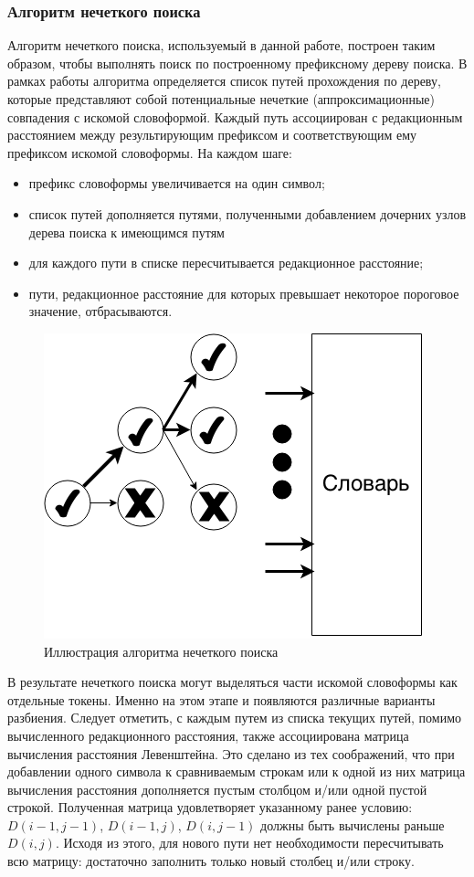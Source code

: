 \subsubsection{Алгоритм нечеткого поиска}
Алгоритм нечеткого поиска, используемый в данной работе, построен таким образом, чтобы выполнять поиск по построенному префиксному дереву поиска. В рамках работы алгоритма определяется список путей прохождения по дереву, которые представляют собой потенциальные нечеткие (аппроксимационные) совпадения с искомой словоформой. Каждый путь ассоциирован с редакционным расстоянием между результирующим префиксом и соответствующим ему префиксом искомой словоформы. На каждом шаге:
\begin{itemize}
	\item
	префикс словоформы увеличивается на один символ;
	\item
	список путей дополняется путями, полученными добавлением дочерних узлов дерева поиска к имеющимся путям
	\item
	для каждого пути в списке пересчитывается редакционное расстояние;
	\item
	пути, редакционное расстояние для которых превышает некоторое пороговое значение, отбрасываются.
\end{itemize}
\begin{figure}[H]
	\centering
	\includegraphics[scale=0.6]{img/treesearch.png}
	\caption{Иллюстрация алгоритма нечеткого поиска}
\end{figure}
В результате нечеткого поиска могут выделяться части искомой словоформы как отдельные токены. Именно на этом этапе и появляются различные варианты разбиения. Следует отметить, с каждым путем из списка текущих путей, помимо вычисленного редакционного расстояния, также ассоциирована матрица вычисления расстояния Левенштейна. Это сделано из тех соображений, что при добавлении одного символа к сравниваемым строкам или к одной из них матрица вычисления расстояния дополняется пустым столбцом и/или одной пустой строкой. Полученная матрица удовлетворяет указанному ранее условию: \(D(i - 1, j - 1)\), \(D(i - 1, j)\), \(D(i, j - 1)\) должны быть вычислены раньше \(D(i, j)\). Исходя из этого, для нового пути нет необходимости пересчитывать всю матрицу: достаточно заполнить только новый столбец и/или строку.
